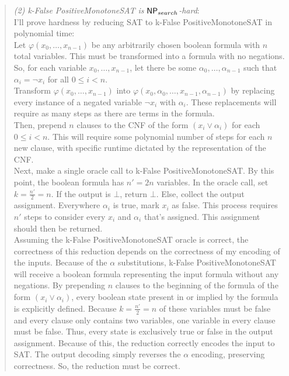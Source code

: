 \documentclass[11pt]{article}
\begin{document}
\begin{enumerate}
\begin{enumerate}
\begin{quote}
            \textit{(2) k-False PositiveMonotoneSAT is $\mathsf{NP}_{search}$-hard}: \\

            I'll prove hardness by reducing SAT to k-False PositiveMonotoneSAT in polynomial time: \\

            Let $\varphi(x_0, \dots, x_{n - 1})$ be any arbitrarily chosen boolean formula with $n$ total variables. This must be transformed into a formula with no negations. So, for each variable $x_0, \dots, x_{n - 1}$, let there be some $\alpha_0, \dots, \alpha_{n - 1}$ such that $\alpha_i = \neg x_i$ for all $0 \leq i < n$. \\

            Transform $\varphi(x_0, \dots, x_{n - 1})$ into $\varphi(x_0, \alpha_0, \dots, x_{n - 1}, \alpha_{n - 1})$ by replacing every instance of a negated variable $\neg x_i$ with $\alpha_i$. These replacements will require as many steps as there are terms in the formula. \\

            Then, prepend $n$ clauses to the CNF of the form $(x_i \lor \alpha_i)$ for each $0 \leq i < n$. This will require some polynomial number of steps for each $n$ new clause, with specific runtime dictated by the representation of the CNF. \\

            Next, make a single oracle call to k-False PositiveMonotoneSAT. By this point, the boolean formula has $n' = 2n$ variables. In the oracle call, set $k = \frac{n'}{2} = n$. If the output is $\bot$, return $\bot$. Else, collect the output assignment. Everywhere $\alpha_i$ is true, mark $x_i$ as false. This process requires $n'$ steps to consider every $x_i$ and $\alpha_i$ that's assigned. This assignment should then be returned. \\

            Assuming the k-False PositiveMonotoneSAT oracle is correct, the correctness of this reduction depends on the correctness of my encoding of the inputs. Because of the $\alpha$ substitutions, k-False PositiveMonotoneSAT will receive a boolean formula representing the input formula without any negations. By prepending $n$ clauses to the beginning of the formula of the form $(x_i \lor \alpha_i)$, every boolean state present in or implied by the formula is explicitly defined. Because $k = \frac{n'}{2} = n$ of these variables must be false and every clause only contains two variables, one variable in every clause must be false. Thus, every state is exclusively true or false in the output assignment. Because of this, the reduction correctly encodes the input to SAT. The output decoding simply reverses the $\alpha$ encoding, preserving correctness. So, the reduction must be correct. \\


\end{quote}
\end{enumerate}
\end{enumerate}
\end{document}
